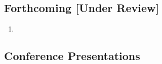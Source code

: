 \documentclass{my_cv}%
\begin{document}
\subsection{\faFileTextO \hspace{0.5em}\bfseries Forthcoming [Under Review]}
\vspace{1em}
\begin{enumerate}
\setlength\itemsep{-0.1em}
\color{mygray}
 \item{} \cite{Renil2023}
\end{enumerate}


\subsection{\faFilePowerpointO \hspace{0.5em}\bfseries Conference Presentations}
\end{document}
